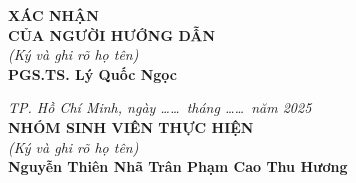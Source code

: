 \documentclass[12pt,a4paper]{article}
\begin{document}
\vspace{1.5em}

\noindent
\begin{minipage}[t]{0.48\textwidth}
    \centering
    \textbf{XÁC NHẬN}\\[0.2em]
    \textbf{CỦA NGƯỜI HƯỚNG DẪN}\\[0.2em]
    \textit{(Ký và ghi rõ họ tên)}\\[4.5em]
    \textbf{PGS.TS. Lý Quốc Ngọc}
\end{minipage}
\hfill
\begin{minipage}[t]{0.48\textwidth}
    \centering
    \textit{TP. Hồ Chí Minh, ngày \dots\dots\ tháng \dots\dots\ năm 2025}\\[0.2em]
    \textbf{NHÓM SINH VIÊN THỰC HIỆN}\\[0.2em]
    \textit{(Ký và ghi rõ họ tên)}\\[4.5em]
    \textbf{Nguyễn Thiên Nhã Trân \quad Phạm Cao Thu Hương}
\end{minipage}
\end{document}

